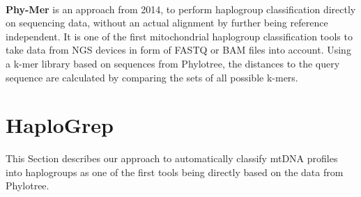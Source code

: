 \\
\textbf{Phy-Mer} is an approach from 2014, to perform haplogroup classification directly on sequencing data, without an actual alignment by further being reference independent. It is one of the first mitochondrial haplogroup classification tools to take data from NGS devices in form of FASTQ or BAM files into account. Using a k-mer library based on sequences from Phylotree, the distances to the query sequence are calculated by comparing the sets of all possible k-mers. \\

\section{HaploGrep}\label{hg:haplogrep}
This Section describes our approach to automatically classify mtDNA profiles into haplogroups as one of the first tools being directly based on the data from Phylotree.
